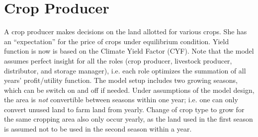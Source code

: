 \documentclass[one column,a4paper]{article}
\title{\mytitle}
\date{}
\author{}
\theoremstyle{definition}
\numberwithin{equation}			{section}
\begin{document}
\maketitle
\section{Crop Producer} %
A crop producer makes decisions on the land allotted for various crops. She has an ``expectation'' for the price of crops under equilibrium condition. Yield function is now is based on the Climate Yield Factor (CYF). Note that the model assumes perfect insight for all the roles (crop producer, livestock producer, distributor, and storage manager), i.e. each role optimizes the summation of all years' profit/utility function. The model setup includes two growing seasons, which can be switch on and off if needed. Under assumptions of the model design, the area is \textit{not} convertible between seasons within one year; i.e. one can only convert unused land to farm land from yearly. Change of crop type to grow for the same cropping area also only occur yearly, as the land used in the first season is assumed not to be used in the second season within a year.
\end{document}
